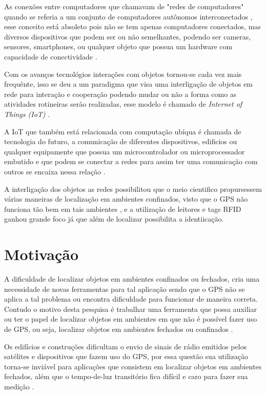 
As conexões entre computadores que chamavam de "redes de computadores" quando se referia a um conjunto de computadores autônomos interconectados \cite{tenenbaum2002}, esse conceito está absoleto pois não se tem apenas computadores conectados, mas diversos dispositivos que podem ser ou não semelhantes, podendo ser cameras, sensores, smartphones, ou qualquer objeto que possua um hardware com capacidade de conectividade \cite{iot2016SBRC}.
\par
Com os avanços tecnológios interações com objetos tornou-se cada vez mais frequênte, isso se deu a um paradigma que visa uma interligação de objetos em rede para interação e cooperação podendo mudar ou não a forma como as atividades rotineiras serão realizadas, esse modelo é chamado de \textit{Internet of Things (IoT)} \cite{realtimeRFID2016}.
\par
A IoT que também está relacionada com computação ubíqua é chamada de tecnologia do futuro, a comunicação de diferentes dispositivos, edificios ou qualquer equipamente que possua um microcontrolador ou microprocessador embutido e que podem se conectar a redes para assim ter uma comunicação com outros se encaixa nessa relação \cite{mechanismRFID2006}.
\par
 A interligação dos objetos as redes possibilitou que o meio cientifico propursessem várias maneiras de localização em ambientes confinados, visto que o GPS não funciona tão bem em tais ambientes \cite{mechanismRFID2006}, e a utilização de leitores e tags RFID ganhou grande foco já que além de localizar possibilita a identiicação.
 \section{Motivação}
A dificuldade de localizar objetos em ambientes confinados ou fechados, cria uma necessidade de novas ferramentas para tal aplicação sendo que o GPS não se aplica a tal problema ou encontra dificuldade para funcionar de maneira correta. Contudo o motivo desta pesquisa é trabalhar uma ferramenta que possa auxiliar ou ter o papel de localizar objetos em ambientes em que não é possível fazer uso de GPS, ou seja, localizar objetos em ambientes fechados ou confinados \cite{mechanismRFID2006}.

\par
Os edifícios e construções dificultam o envio de sinais de rádio emitidos pelos satélites e dispositivos que fazem uso do GPS, por essa questão sua utilização torna-se inviável para aplicações que consistem em localizar objetos em ambientes fechados, além que o tempo-de-luz transitório fica difícil e caro para fazer sua medição \cite{rfid2009review}.


